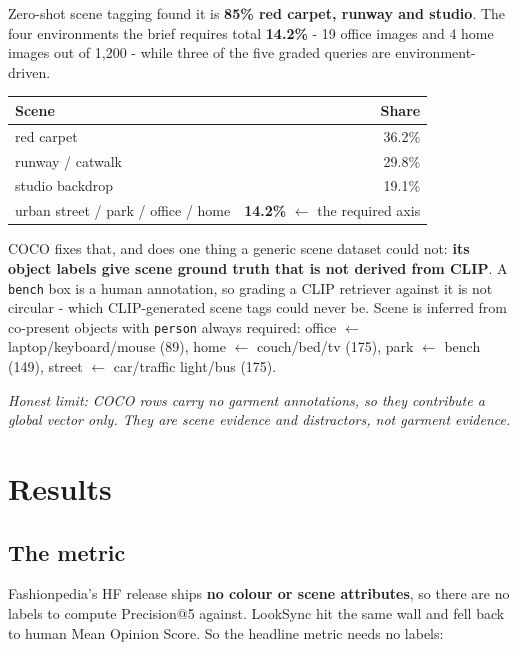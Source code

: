 \documentclass[10pt,a4paper]{article}
\begin{document}
Zero-shot scene tagging found it is \textbf{85\% red carpet, runway and studio}. The
four environments the brief requires total \textbf{14.2\%} - 19 office images and 4
home images out of 1{,}200 - while three of the five graded queries are
environment-driven.

\begin{center}\small
\begin{tabular}{@{}lr@{}}
\toprule
\textbf{Scene} & \textbf{Share} \\
\midrule
red carpet & 36.2\% \\
runway / catwalk & 29.8\% \\
studio backdrop & 19.1\% \\
urban street / park / office / home & \textbf{14.2\%} $\leftarrow$ the required axis \\
\bottomrule
\end{tabular}
\end{center}

COCO fixes that, and does one thing a generic scene dataset could not: \textbf{its object
labels give scene ground truth that is not derived from CLIP}. A \texttt{bench} box is a
human annotation, so grading a CLIP retriever against it is not circular - which
CLIP-generated scene tags could never be. Scene is inferred from co-present objects with
\texttt{person} always required: office $\leftarrow$ laptop/keyboard/mouse (89), home
$\leftarrow$ couch/bed/tv (175), park $\leftarrow$ bench (149), street $\leftarrow$
car/traffic light/bus (175).

{\small\itshape Honest limit: COCO rows carry no garment annotations, so they contribute a
global vector only. They are scene evidence and distractors, not garment evidence.}

\section{Results}

\subsection{The metric}

Fashionpedia's HF release ships \textbf{no colour or scene attributes}, so there are no
labels to compute Precision@5 against. LookSync hit the same wall and fell back to human
Mean Opinion Score. So the headline metric needs no labels:
\end{document}
